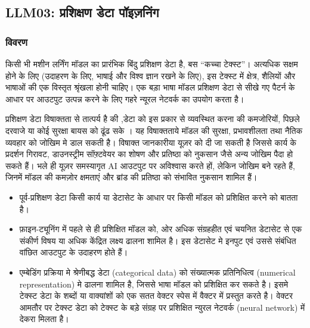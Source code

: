 \documentclass[
]{article}
\author{}
\date{}
\providecommand{\tightlist}{%
  \setlength{\itemsep}{0pt}\setlength{\parskip}{0pt}}
\begin{document}
\subsection{LLM03: प्रशिक्षण डेटा
पॉइज़निंग}\label{llm03-ux92aux930ux936ux915ux937ux923-ux921ux91f-ux92aux907ux91cux928ux917}

\subsubsection{विवरण}\label{ux935ux935ux930ux923}

किसी भी मशीन लर्निंग मॉडल का प्रारंभिक बिंदु प्रशिक्षण डेटा है, बस ``कच्चा टेक्स्ट''।
अत्यधिक सक्षम होने के लिए (उदाहरण के लिए, भाषाई और विश्व ज्ञान रखने के लिए), इस
टेक्स्ट में क्षेत्र, शैलियों और भाषाओं की एक विस्तृत श्रृंखला होनी चाहिए। एक बड़ा भाषा
मॉडल प्रशिक्षण डेटा से सीखे गए पैटर्न के आधार पर आउटपुट उत्पन्न करने के लिए गहरे न्यूरल
नेटवर्क का उपयोग करता है।

प्रशिक्षण डेटा विषाक्तता से तात्पर्य है की ,डेटा को इस प्रकार से व्यवस्थित करना की
कमजोरियों, पिछले दरवाजे या कोई सुरक्षा बायस को ढूंढ सके । यह विषाक्तताये मॉडल की
सुरक्षा, प्रभावशीलता तथा नैतिक व्यवहार को जोखिम मे डाल सकती है। विषाक्त
जानकारीया यूज़र को दी जा सकती है जिससे कार्य के प्रदर्शन गिरावट, डाउनस्ट्रीम
सॉफ़्टवेयर का शोषण और प्रतिष्ठा को नुकसान जैसे अन्य जोखिम पैदा हो सकते हैं। भले ही यूज़र
समस्यागृत AI आउटपुट पर अविश्वास करते हों, लेकिन जोखिम बने रहते हैं, जिनमें मॉडल की
कमज़ोर क्षमताएं और ब्रांड की प्रतिष्ठा को संभावित नुकसान शामिल हैं।

\begin{itemize}
\tightlist
\item
  पूर्व-प्रशिक्षण डेटा किसी कार्य या डेटासेट के आधार पर किसी मॉडल को प्रशिक्षित करने
  को बातता है।
\item
  फ़ाइन-ट्यूनिंग में पहले से ही प्रशिक्षित मॉडल को, ओर अधिक संग्रहहीत एवं चयनित डेटासेट
  से एक संकीर्ण विषय या अधिक केंद्रित लक्ष्य ढालना शामिल है। इस डेटासेट मे इनपुट एवं
  उससे संबंधित वांछित आउटपुट के उदाहरण होते हैं।
\item
  एम्बेडिंग प्रक्रिया मे श्रेणीबद्ध डेटा (categorical data) को संख्यात्मक प्रतिनिधित्व
  (numerical representation) मे ढालना शामिल है, जिससे भाषा मॉडल को प्रशिक्षित
  कर सकते है। इसमे टेक्स्ट डेटा के शब्दों या वाक्यांशों को एक सतत वेक्टर स्पेस में वैक्टर में
  प्रस्तुत करते है। वेक्टर आमतौर पर टेक्स्ट डेटा को टेक्स्ट के बड़े संग्रह पर प्रशिक्षित न्युरल
  नेटवर्क (neural network) में देकरा मिलता है।
\end{itemize}
\end{document}
